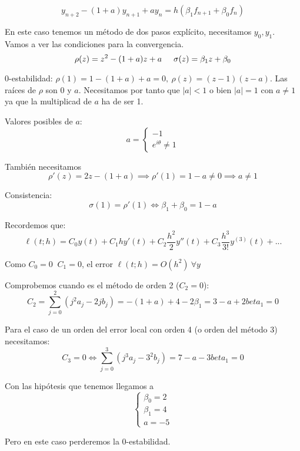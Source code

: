 \documentclass[openany]{book}
\begin{document}
    \begin{exercise}
        $$ y_{n+2}-(1+a)y_{n+1}+ay_n = h(\beta_1f_{n+1}+\beta_0f_n)  $$
        
        En este caso tenemos un método de dos pasos explícito, necesitamos $ y_0,y_1 $. Vamos a ver las condiciones para la convergencia.
        $$ \rho(z)=z^2-(1+a)z+a \hspace{5mm} \sigma(z) = \beta_1z+\beta_0$$

        0-estabilidad: $ \rho(1)=1-(1+a)+a=0,\ \rho(z)=(z-1)(z-a) $. Las raíces de $\rho$ son 0 y $ a $. Necesitamos por tanto que $ |a| <1 $ o bien $ |a|=1 $ con $ a\ne1 $ ya que la multiplicad de $ a $ ha de ser 1.

        Valores posibles de $ a $:
        $$ a=\left\{
        \begin{array}{l}
            -1 \\
            e^{i \theta} \ne 1
        \end{array}
        \right. $$

        También necesitamos
        $$ \rho'(z) = 2z - (1+a) \implies \rho'(1) = 1-a \ne 0 \implies a \ne 1 $$
        
        Consistencia:
        $$ \sigma(1) = \rho'(1) \iff \beta_1+\beta_0 = 1-a $$

        Recordemos que:
        $$ \ell(t;h) = C_0y(t)+C_1 h y'(t) + C_2 \dfrac{h^2}{2}y''(t) + C_3 \dfrac{h^3}{3!}y ^{(3)}(t) + ... $$

        Como $ C_0 = 0\ $ $C_1 = 0$, el error $ \ell(t;h) = O(h^2)\ \forall y$

        Comprobemos cuando es el método de orden 2 ($ C_2=0 $):
        $$ C_2 = \sum\limits_{j=0}^{2}(j^2a_j-2jb_j) = -(1+a)+4 -2 \beta_1 = 3-a+2beta_1 = 0 $$

        Para el caso de un orden del error local con orden 4 (o orden del método 3) necesitamos:
        $$ C_3 = 0 \iff \sum\limits_{j=0}^{3}(j^3a_j-3^2b_j)=7-a-3beta_1=0 $$

        Con las hipótesis que tenemos llegamos a 
        $$ \left\{
        \begin{array}{l}
            \beta_0 =2        \\
            \beta_1=4\\
            a=-5
        \end{array}
        \right. $$

        Pero en este caso perderemos la 0-estabilidad.

    \end{exercise}
\end{document}
